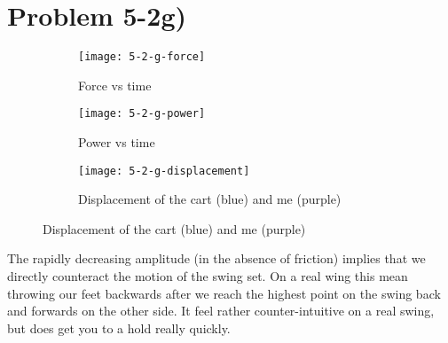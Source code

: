 \section*{Problem 5-2g)}
\begin{figure}[h]
\centering
\begin{subfigure}[b]{0.48\textwidth}
\texttt{[image: 5-2-g-force]}
\label{fig:2-1-a}
\caption{Force vs time}
\end{subfigure}
\begin{subfigure}[b]{0.48\textwidth}
\texttt{[image: 5-2-g-power]}
\label{fig:2-1-a}
\caption{Power vs time}
\end{subfigure}
\begin{subfigure}[b]{0.48\textwidth}
\texttt{[image: 5-2-g-displacement]}
\label{fig:2-1-a}
\caption{Displacement of the cart (blue) and me (purple)}
\end{subfigure}
\end{figure}
The rapidly decreasing amplitude (in the absence of friction) implies that we directly counteract the motion of the swing set. On a real wing this mean throwing our feet backwards after we reach the highest point on the swing back and forwards on the other side. It feel rather counter-intuitive on a real swing, but does get you to a hold really quickly.
  
